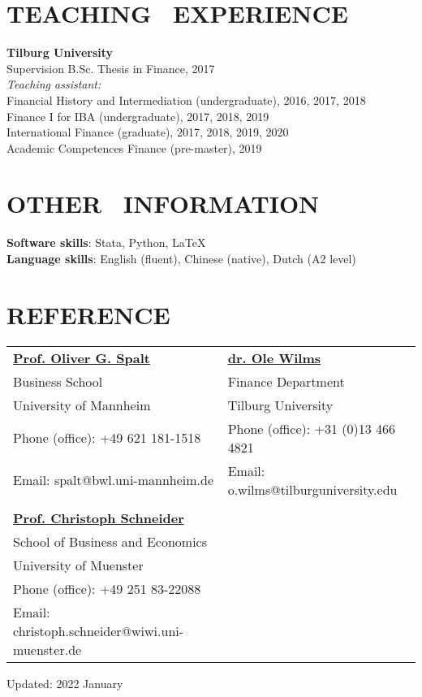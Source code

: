 \documentclass[margin]{res}
\newcommand{\forceindent}{\leavevmode{\parindent=1.5em\indent}}
\begin{document}
\begin{resume}
\section{\textbf{TEACHING \ EXPERIENCE}}
\textbf{Tilburg University}	\\
	\forceindent Supervision B.Sc. Thesis in Finance, 2017    \\
	\textit{Teaching assistant:}\\
	\forceindent Financial History and Intermediation (undergraduate), 2016, 2017, 2018 \\
	\forceindent Finance I for IBA (undergraduate), 2017, 2018, 2019    \\
	\forceindent International Finance (graduate), 2017, 2018, 2019, 2020\\
	\forceindent Academic Competences Finance (pre-master), 2019


\section{\textbf{OTHER \ INFORMATION}}
\textbf{Software skills}: Stata, Python, \LaTeX 	\\
\textbf{Language skills}: English (fluent), Chinese (native), Dutch (A2 level)


\section{\textbf{REFERENCE}}
\vspace{0.1cm} 
\hspace*{-0.3cm}
\begin{tabular}{ll}
	\href{https://www.bwl.uni-mannheim.de/en/spalt/team/prof-dr-oliver-spalt/}{\textbf{Prof. Oliver G. Spalt}} &  {\href{https://www.tilburguniversity.edu/staff/o-wilms}{\textbf{dr. Ole Wilms}}} \\
	Business School & Finance Department \\
	University of Mannheim & Tilburg University \\
	Phone (office): +49 621 181-1518 &  Phone (office): +31 (0)13 466 4821 \\
	Email: spalt@bwl.uni-mannheim.de & Email: o.wilms@tilburguniversity.edu \\
	&  \\
	\href{https://www.wiwi.uni-muenster.de/fcm/en/the-fcm/pf/team/christoph-schneider}{\textbf{Prof. Christoph Schneider}} &  \\
	School of Business and Economics &  \\
	University of Muenster  &  \\
	Phone (office): +49 251 83-22088  &  \\
	Email: christoph.schneider@wiwi.uni-muenster.de &  \\
\end{tabular}%

 

 
\begin{flushright}
	Updated: 2022 January
\end{flushright}
 
\end{resume}
\end{document}
